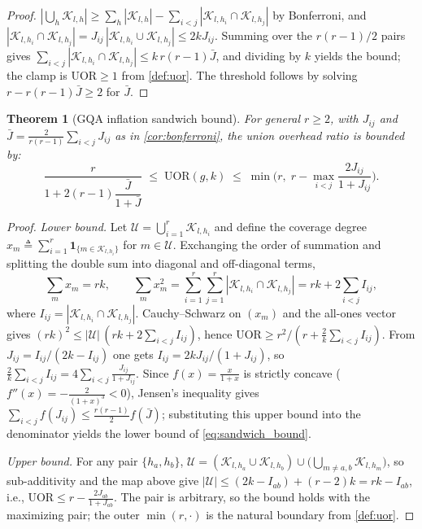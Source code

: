 \documentclass[final,5p,times,twocolumn]{elsarticle}
\newtheorem{theorem}{Theorem}
\theoremstyle{definition}
\theoremstyle{remark}
\newcommand{\UOR}{\mathrm{UOR}}
\newcommand{\TokSet}[1]{\mathcal{K}_{l,#1}}
\begin{document}
\begin{proof}
 $|\bigcup_h \TokSet{h}| \ge \sum_h |\TokSet{h}|
-\sum_{i<j}|\TokSet{h_i}\cap\TokSet{h_j}|$ by Bonferroni, and
 $|\TokSet{h_i}\cap\TokSet{h_j}| = J_{ij}\,|\TokSet{h_i}\cup\TokSet{h_j}|
\le 2kJ_{ij}$. Summing over the $r(r-1)/2$ pairs gives
 $\sum_{i<j}|\TokSet{h_i}\cap\TokSet{h_j}| \le k\,r(r-1)\bar{J}$, and
dividing by $k$ yields the bound; the clamp is $\UOR \ge 1$ from
\cref{def:uor}. The threshold follows by solving
 $r - r(r-1)\bar{J} \ge 2$ for $\bar{J}$.
\end{proof}

\begin{theorem}[GQA inflation sandwich bound]
\label{thm:sandwich_bound}
For general $r \ge 2$, with $J_{ij}$ and
 $\bar{J} = \frac{2}{r(r-1)}\sum_{i<j}J_{ij}$ as in
\cref{cor:bonferroni}, the union overhead ratio is bounded by:
\begin{equation}
\frac{r}{1 + 2(r-1)\dfrac{\bar{J}}{1+\bar{J}}}
\;\le\;
\UOR(g, k)
\;\le\;
\min\Biggl(r, \; r - \max_{i < j} \frac{2 J_{ij}}{1 + J_{ij}}\Biggr).
\label{eq:sandwich_bound}
\end{equation}
\end{theorem}

\begin{proof}
\emph{Lower bound.} Let
 $\mathcal{U} = \bigcup_{i=1}^{r}\TokSet{h_i}$ and define the coverage
degree $x_m \triangleq \sum_{i=1}^{r}
\mathbf{1}_{\{m \in \TokSet{h_i}\}}$ for $m \in \mathcal{U}$. Exchanging
the order of summation and splitting the double sum into diagonal and
off-diagonal terms,
\begin{equation}
\sum_{m} x_m = rk,
\qquad
\sum_{m} x_m^{2}
= \sum_{i=1}^{r}\sum_{j=1}^{r}
  |\TokSet{h_i} \cap \TokSet{h_j}|
= rk + 2\sum_{i<j} I_{ij},
\label{eq:coverage_sums}
\end{equation}
where $I_{ij} = |\TokSet{h_i} \cap \TokSet{h_j}|$. Cauchy--Schwarz on
 $(x_m)$ and the all-ones vector gives
 $(rk)^{2} \le |\mathcal{U}|\,(rk + 2\sum_{i<j}I_{ij})$, hence
 $\UOR \ge r^{2}/(r + \tfrac{2}{k}\sum_{i<j}I_{ij})$. From
 $J_{ij} = I_{ij}/(2k - I_{ij})$ one gets
 $I_{ij} = 2kJ_{ij}/(1+J_{ij})$, so
 $\tfrac{2}{k}\textstyle\sum_{i<j}I_{ij}
= 4\sum_{i<j}\frac{J_{ij}}{1+J_{ij}}$. Since
 $f(x) = \frac{x}{1+x}$ is strictly concave
($f''(x) = -\frac{2}{(1+x)^{3}} < 0$), Jensen's inequality gives
 $\sum_{i<j} f(J_{ij}) \le \frac{r(r-1)}{2}f(\bar{J})$; substituting this
upper bound into the denominator yields the lower bound of
\cref{eq:sandwich_bound}.

\emph{Upper bound.} For any pair $\{h_a, h_b\}$,
 $\mathcal{U} = (\TokSet{h_a} \cup \TokSet{h_b}) \cup
\bigl(\bigcup_{m \neq a,b}\TokSet{h_m}\bigr)$, so sub-additivity and the
map above give
 $|\mathcal{U}| \le (2k - I_{ab}) + (r-2)k = rk - I_{ab}$, i.e.,
 $\UOR \le r - \frac{2J_{ab}}{1+J_{ab}}$. The pair is arbitrary, so the
bound holds with the maximizing pair; the outer $\min(r,\cdot)$ is the
natural boundary from \cref{def:uor}.
\end{proof}
\end{document}

